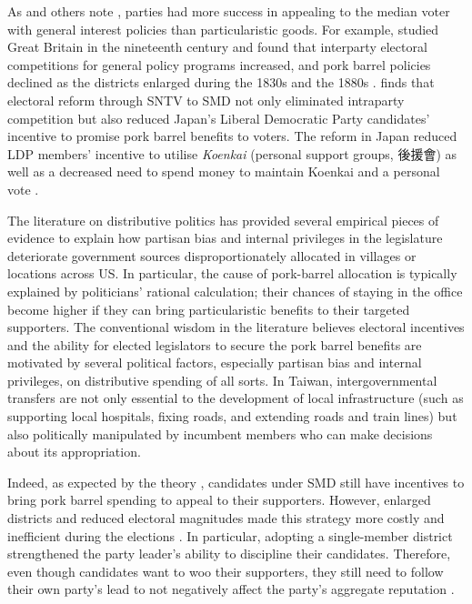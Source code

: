 As \citet{Cain1987} and others note \citep[e.g.][]{Cox1987b}, parties had more success in appealing to the median voter with general interest policies than particularistic goods. For example, \citet{Cox1987b} studied Great Britain in the nineteenth century and found that interparty electoral competitions for general policy programs increased, and pork barrel policies declined as the districts enlarged during the 1830s and the 1880s \citep{Cox1987b}. \citet{Catalinac2016, Catalinac2017} finds that electoral reform through SNTV to SMD not only eliminated intraparty competition but also reduced Japan's Liberal Democratic Party candidates' incentive to promise pork barrel benefits to voters. The reform in Japan reduced LDP members' incentive to utilise \textit{Koenkai} (personal support groups, 後援會)  as well as a decreased need to spend money to maintain Koenkai and a personal vote \citep[][]{Carlson2006}. 

The literature on distributive politics has provided several empirical pieces of evidence to explain how partisan bias and internal privileges in the legislature deteriorate government sources disproportionately allocated in villages or locations across US. In particular, the cause of pork-barrel allocation is typically explained by politicians' rational calculation; their chances of staying in the office become higher if they can bring particularistic benefits to their targeted supporters. The conventional wisdom in the literature believes electoral incentives and the ability for elected legislators to secure the pork barrel benefits are motivated by several political factors, especially partisan bias and internal privileges, on distributive spending of all sorts. In Taiwan, intergovernmental transfers are not only essential to the development of local infrastructure (such as supporting local hospitals, fixing roads, and extending roads and train lines) but also politically manipulated by incumbent members who can make decisions about its appropriation.

Indeed, as expected by the theory \citep[e.g.][]{Lancaster1986}, candidates under SMD still have incentives to bring pork barrel spending to appeal to their supporters. However, enlarged districts and reduced electoral magnitudes made this strategy more costly and inefficient during the elections \citep[][]{Myerson1993, Cox1997, Carey1995}. In particular, adopting a single-member district strengthened the party leader's ability to discipline their candidates. Therefore, even though candidates want to woo their supporters, they still need to follow their own party's lead to not negatively affect the party's aggregate reputation \citep{Ramseyer1993, Hirano2006}.

